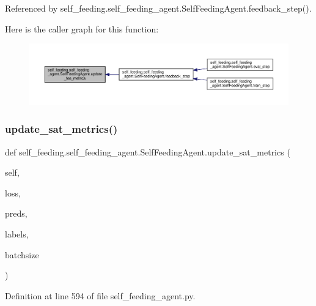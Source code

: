 Referenced by self\+\_\+feeding.\+self\+\_\+feeding\+\_\+agent.\+Self\+Feeding\+Agent.\+feedback\+\_\+step().

Here is the caller graph for this function\+:
\nopagebreak
\begin{figure}[H]
\begin{center}
\leavevmode
\includegraphics[width=350pt]{classself__feeding_1_1self__feeding__agent_1_1SelfFeedingAgent_a4a3059142c34335e709642a333cfd0a2_icgraph}
\end{center}
\end{figure}
\mbox{\label{classself__feeding_1_1self__feeding__agent_1_1SelfFeedingAgent_a01851e94cd789600609c8aa3c3696241}} 
\subsubsection{\texorpdfstring{update\+\_\+sat\+\_\+metrics()}{update\_sat\_metrics()}}
{\footnotesize\ttfamily def self\+\_\+feeding.\+self\+\_\+feeding\+\_\+agent.\+Self\+Feeding\+Agent.\+update\+\_\+sat\+\_\+metrics (\begin{DoxyParamCaption}\item[{}]{self,  }\item[{}]{loss,  }\item[{}]{preds,  }\item[{}]{labels,  }\item[{}]{batchsize }\end{DoxyParamCaption})}



Definition at line 594 of file self\+\_\+feeding\+\_\+agent.\+py.



